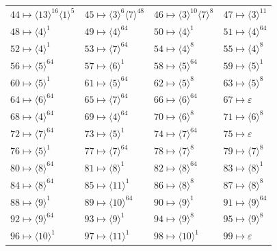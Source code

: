 {\begin{longtable}{@{}llll@{}}
\(44\mapsto \langle 13\rangle^{16}\langle 1\rangle^{5}\) & \(45\mapsto \langle 3\rangle^{6}\langle 7\rangle^{48}\) & \(46\mapsto \langle 3\rangle^{10}\langle 7\rangle^{8}\) & \(47\mapsto \langle 3\rangle^{11}\)\\
\(48\mapsto \langle 4\rangle^{1}\) & \(49\mapsto \langle 4\rangle^{64}\) & \(50\mapsto \langle 4\rangle^{1}\) & \(51\mapsto \langle 4\rangle^{64}\)\\
\(52\mapsto \langle 4\rangle^{1}\) & \(53\mapsto \langle 7\rangle^{64}\) & \(54\mapsto \langle 4\rangle^{8}\) & \(55\mapsto \langle 4\rangle^{8}\)\\
\(56\mapsto \langle 5\rangle^{64}\) & \(57\mapsto \langle 6\rangle^{1}\) & \(58\mapsto \langle 5\rangle^{64}\) & \(59\mapsto \langle 5\rangle^{1}\)\\
\(60\mapsto \langle 5\rangle^{1}\) & \(61\mapsto \langle 5\rangle^{64}\) & \(62\mapsto \langle 5\rangle^{8}\) & \(63\mapsto \langle 5\rangle^{8}\)\\
\(64\mapsto \langle 6\rangle^{64}\) & \(65\mapsto \langle 7\rangle^{64}\) & \(66\mapsto \langle 6\rangle^{64}\) & \(67\mapsto \varepsilon\)\\
\(68\mapsto \langle 4\rangle^{64}\) & \(69\mapsto \langle 4\rangle^{64}\) & \(70\mapsto \langle 6\rangle^{8}\) & \(71\mapsto \langle 6\rangle^{8}\)\\
\(72\mapsto \langle 7\rangle^{64}\) & \(73\mapsto \langle 5\rangle^{1}\) & \(74\mapsto \langle 7\rangle^{64}\) & \(75\mapsto \varepsilon\)\\
\(76\mapsto \langle 5\rangle^{1}\) & \(77\mapsto \langle 7\rangle^{64}\) & \(78\mapsto \langle 7\rangle^{8}\) & \(79\mapsto \langle 7\rangle^{8}\)\\
\(80\mapsto \langle 8\rangle^{64}\) & \(81\mapsto \langle 8\rangle^{1}\) & \(82\mapsto \langle 8\rangle^{64}\) & \(83\mapsto \langle 8\rangle^{1}\)\\
\(84\mapsto \langle 8\rangle^{64}\) & \(85\mapsto \langle 11\rangle^{1}\) & \(86\mapsto \langle 8\rangle^{8}\) & \(87\mapsto \langle 8\rangle^{8}\)\\
\(88\mapsto \langle 9\rangle^{1}\) & \(89\mapsto \langle 10\rangle^{64}\) & \(90\mapsto \langle 9\rangle^{1}\) & \(91\mapsto \langle 9\rangle^{64}\)\\
\(92\mapsto \langle 9\rangle^{64}\) & \(93\mapsto \langle 9\rangle^{1}\) & \(94\mapsto \langle 9\rangle^{8}\) & \(95\mapsto \langle 9\rangle^{8}\)\\
\(96\mapsto \langle 10\rangle^{1}\) & \(97\mapsto \langle 11\rangle^{1}\) & \(98\mapsto \langle 10\rangle^{1}\) & \(99\mapsto \varepsilon\)\\

\end{longtable}}
